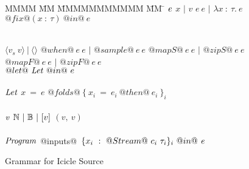
\begin{figure}

\begin{tabbing}
MMMM \= MM \= MMMMMMMMMMM \= MM \= \kill
$\mathit{e}$
\GrammarDef $x$
\> $|$ \> $v$
\GrammarAlt $e~e$
\> $|$ \> $\lambda{}x~:~\tau.~e$
\GrammarAlt $@fix@ (x~:~\tau)~@in@~e$

\\
\GrammarAlt $\langle v_s ~ v \rangle ~|~ \langle\rangle$
\GrammarAlt $@when@~e~e$
\> $|$ \> $@sample@~e~e$
\GrammarAlt $@mapS@~e~e$
\> $|$ \> $@zipS@~e~e$
\GrammarAlt $@mapF@~e~e$
\> $|$ \> $@zipF@~e~e$
\\
\GrammarAlt $@let@~\mathit{Let}~@in@~e$
\\
\\

$\mathit{Let}$
\GrammarDef $x~=~e$
\GrammarAlt $@folds@~\{~x_i~=~e_i~@then@~e_i~\}_i$
\\
\\

$\mathit{v}$
\GrammarDef $\mathbb{N} ~|~ \mathbb{B} ~|~ [v]$
\GrammarAlt $(v,~v)$
\\
\\


$\mathit{Program}$
\GrammarDef @inputs@~$\{ x_i~:~@Stream@~c_i~\tau_i \}_i~@in@~\mathit{e}$ \\
\end{tabbing}

\caption{Grammar for Icicle Source}
\label{fig:source:grammar}
\end{figure}

